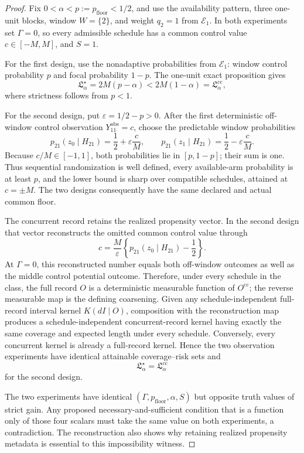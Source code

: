 \documentclass{article}
\begin{document}
\begin{proof}
Fix \(0<\alpha<p:=p_{\mathrm{floor}}<1/2\), and use the availability pattern, three one-unit blocks, window \(W=\{2\}\), and weight \(q_2=1\) from \(\mathcal E_1\).  In both experiments set \(\Gamma=0\), so every admissible schedule has a common control value \(c\in[-M,M]\), and \(S=1\).

For the first design, use the nonadaptive probabilities from \(\mathcal E_1\): window control probability \(p\) and focal probability \(1-p\).  The one-unit exact proposition gives
\[
 \mathfrak L_\alpha^\star=2M(p-\alpha)
 <2M(1-\alpha)=\mathfrak L_\alpha^{\mathrm{cc}},
\]
where strictness follows from \(p<1\).

For the second design, put \(\varepsilon=1/2-p>0\).  After the first deterministic off-window control observation \(Y^{\mathrm{obs}}_{11}=c\), choose the predictable window probabilities
\[
 p_{21}(z_0\mid H_{21})=\frac12+\varepsilon\frac{c}{M},
 \qquad
 p_{21}(z_1\mid H_{21})=\frac12-\varepsilon\frac{c}{M}.
\]
Because \(c/M\in[-1,1]\), both probabilities lie in \([p,1-p]\); their sum is one.  Thus sequential randomization is well defined, every available-arm probability is at least \(p\), and the lower bound is sharp over compatible schedules, attained at \(c=\pm M\).  The two designs consequently have the same declared and actual common floor.

The concurrent record retains the realized propensity vector.  In the second design that vector reconstructs the omitted common control value through
\[
 c=\frac{M}{\varepsilon}
 \left\{p_{21}(z_0\mid H_{21})-\frac12\right\}.
\]
At \(\Gamma=0\), this reconstructed number equals both off-window outcomes as well as the middle control potential outcome.  Therefore, under every schedule in the class, the full record \(O\) is a deterministic measurable function of \(O^{\mathrm{cc}}\); the reverse measurable map is the defining coarsening.  Given any schedule-independent full-record interval kernel \(K(dI\mid O)\), composition with the reconstruction map produces a schedule-independent concurrent-record kernel having exactly the same coverage and expected length under every schedule.  Conversely, every concurrent kernel is already a full-record kernel.  Hence the two observation experiments have identical attainable coverage--risk sets and
\[
 \mathfrak L_\alpha^\star=\mathfrak L_\alpha^{\mathrm{cc}}
\]
for the second design.

The two experiments have identical \((\Gamma,p_{\mathrm{floor}},\alpha,S)\) but opposite truth values of strict gain.  Any proposed necessary-and-sufficient condition that is a function only of those four scalars must take the same value on both experiments, a contradiction.  The reconstruction also shows why retaining realized propensity metadata is essential to this impossibility witness.
\end{proof}
\end{document}
